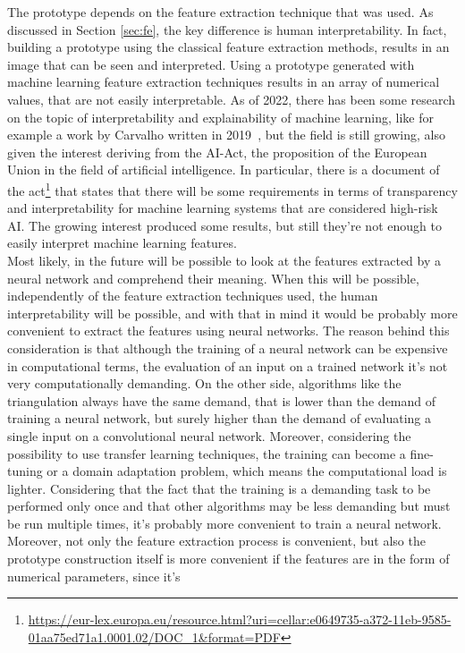\documentclass[conference]{IEEEtran}
\begin{document}
			\noindent The prototype depends on the feature extraction technique that was used. As discussed in Section \ref{sec:fe}, the key difference is human interpretability. In fact, building a prototype using the 
			classical feature extraction methods, results in an image that can be seen and interpreted. Using a prototype generated with machine learning feature extraction techniques results in an array 
			of numerical values, that are not easily interpretable. As of 2022, there has been some research on the topic of interpretability and explainability of machine learning, like for example 
			a work by Carvalho written in 2019~\cite{electronics8080832}, 
			but the field is still growing, also given the interest deriving from the AI-Act, the proposition of the European Union in the field of artificial intelligence. In particular, there is a document of 
			the act\footnote{\url{https://eur-lex.europa.eu/resource.html?uri=cellar:e0649735-a372-11eb-9585-01aa75ed71a1.0001.02/DOC_1&format=PDF}} that states that there will be some requirements in terms of 
			transparency and interpretability for machine learning systems that are considered high-risk AI. The growing interest produced some results, but still they're not enough to easily interpret machine learning 
			features.\\
			Most likely, in the future will be possible to look at the features extracted by a neural network and comprehend their meaning. When this will be possible, independently of the feature extraction techniques 
			used, the human interpretability will be possible, and with that in mind it would be probably more convenient to extract the features using neural networks. The reason behind this consideration is 
			that although the training of a neural network can be expensive in computational terms, the evaluation of an input on a trained network it's not very computationally demanding. On the other side, algorithms 
			like the triangulation always have the same demand, that is lower than the demand of training a neural network, but surely higher than the demand of evaluating a single input on a convolutional neural network. 
			Moreover, considering the possibility to use transfer learning techniques, the training can become a fine-tuning or a domain adaptation problem, which means the computational load is lighter. Considering that 
			the fact that the training is a demanding task to be performed only once and that other algorithms may be less demanding but must be run multiple times, it's probably more convenient to train a neural 
			network. Moreover, not only the feature extraction process is convenient, but also the prototype construction itself is more convenient if the features are in the form of numerical parameters, since it's 
\end{document}
